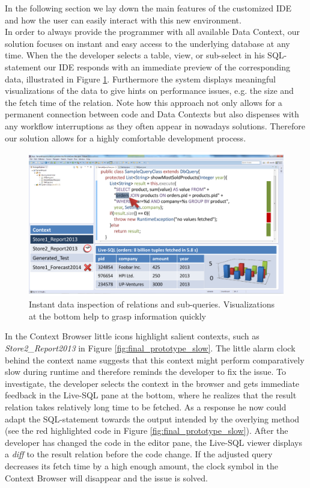 In the following section we lay down the main features of the customized IDE and how the user can easily interact with this new environment.\\
In order to always provide the programmer with all available Data Context, our solution focuses on instant and easy access to the underlying database at any time. When the the developer selects a table, view, or sub-select in his SQL-statement our IDE responds with an immediate preview of the corresponding data, illustrated in Figure \ref{fig:final_prototype_instant}. Furthermore the system displays meaningful visualizations of the data to give hints on performance issues, e.g. the size and the fetch time of the relation. Note how this approach not only allows for a permanent connection between code and Data Contexts but also dispenses with any workflow interruptions as they often appear in nowadays solutions. Therefore our solution allows for a highly comfortable development process.\\
\begin{figure}
\begin{centering}
    \includegraphics[width=1.0\linewidth]{images/instant}
    \caption{Instant data inspection of relations and sub-queries. Visualizations at the bottom help to grasp information quickly}
    \label{fig:final_prototype_instant}
\end{centering}
\end{figure}
In the Context Browser little icons highlight salient contexts, such as \emph{Store2\_Report2013} in Figure \ref{fig:final_prototype_slow}. The little alarm clock behind the context name suggests that this context might perform comparatively slow during runtime and therefore reminds the developer to fix the issue. To investigate, the developer selects the context in the browser and gets immediate feedback in the Live-SQL pane at the bottom, where he realizes that the result relation takes relatively long time to be fetched. As a response he now could adapt the SQL-statement towards the output intended by the overlying method (see the red highlighted code in Figure \ref{fig:final_prototype_slow}). After the developer has changed the code in the editor pane, the Live-SQL viewer displays a \emph{diff} to the result relation before the code change. If the adjusted query decreases its fetch time by a high enough amount, the clock symbol in the Context Browser will disappear and the issue is solved.\\

